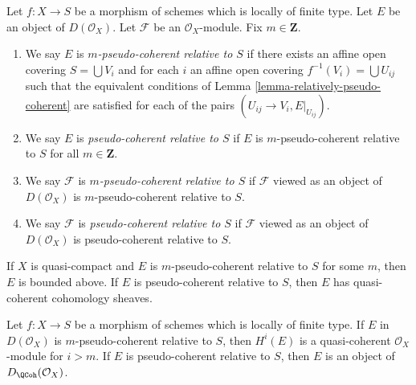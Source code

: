 \begin{definition}
\label{definition-relative-pseudo-coherence}
Let $f : X \to S$ be a morphism of schemes which is locally of finite type.
Let $E$ be an object of $D(\mathcal{O}_X)$. Let $\mathcal{F}$ be an
$\mathcal{O}_X$-module. Fix $m \in \mathbf{Z}$.
\begin{enumerate}
\item We say $E$ is {\it $m$-pseudo-coherent relative to $S$}
if there exists an affine open covering $S = \bigcup V_i$ and
for each $i$ an affine open covering $f^{-1}(V_i) = \bigcup U_{ij}$
such that the equivalent conditions of
Lemma \ref{lemma-relatively-pseudo-coherent}
are satisfied for each of the pairs $(U_{ij} \to V_i, E|_{U_{ij}})$.
\item We say $E$ is {\it pseudo-coherent relative to $S$}
if $E$ is $m$-pseudo-coherent relative to $S$ for all $m \in \mathbf{Z}$.
\item We say $\mathcal{F}$ is {\it $m$-pseudo-coherent relative to $S$} if
$\mathcal{F}$ viewed as an object of $D(\mathcal{O}_X)$ is
$m$-pseudo-coherent relative to $S$.
\item We say $\mathcal{F}$ is {\it pseudo-coherent relative to $S$} if
$\mathcal{F}$ viewed as an object of $D(\mathcal{O}_X)$ is
pseudo-coherent relative to $S$.
\end{enumerate}
\end{definition}

\noindent
If $X$ is quasi-compact and $E$ is $m$-pseudo-coherent relative to $S$
for some $m$, then $E$ is bounded above. If $E$ is
pseudo-coherent relative to $S$, then $E$ has
quasi-coherent cohomology sheaves.

\begin{lemma}
\label{lemma-relative-pseudo-coherence}
Let $f : X \to S$ be a morphism of schemes which is locally of finite type.
If $E$ in $D(\mathcal{O}_X)$ is $m$-pseudo-coherent relative to $S$,
then $H^i(E)$ is a quasi-coherent $\mathcal{O}_X$-module for $i > m$.
If $E$ is pseudo-coherent relative to $S$, then $E$ is an object of
$D_\QCoh(\mathcal{O}_X)$.
\end{lemma}

